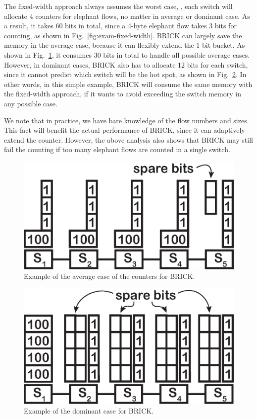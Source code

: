 The fixed-width approach always assumes the worst case, \ie, each switch will allocate 4 counters for elephant flows, no matter in average or dominant case.
As a result, it takes 60 bits in total, since a 4-byte elephant flow takes 3 bits for counting, as shown in Fig.~\ref{fig:exam-fixed-width}.
BRICK can largely save the memory in the average case, because it can flexibly extend the 1-bit bucket.
As shown in Fig.~\ref{fig:exam-brick-avg}, it consumes 30 bits in total to handle all possible average cases.
However, in dominant cases, BRICK also has to allocate 12 bits for each switch, since it cannot predict which switch will be the hot spot, as shown in Fig.~\ref{fig:exam-brick-dmn}.
In other words, in this simple example, BRICK will consume the same memory with the fixed-width approach, if it wants to avoid exceeding the switch memory in any possible case.

We note that in practice, we have bare knowledge of the flow numbers and sizes.
This fact will benefit the actual performance of BRICK, since it can adaptively extend the counter.
However, the above analysis also shows that BRICK may still fail the counting if too many elephant flows are counted in a single switch.

\begin{figure}[t]
    \centering
    \includegraphics[width=0.6\linewidth]{pic/exam-brick-avg}
    \caption{Example of the average case of the counters for BRICK.
     }
    \label{fig:exam-brick-avg}
\end{figure}

\begin{figure}[t]
    \centering
    \includegraphics[width=0.6\linewidth]{pic/exam-brick-dmn}
    \caption{Example of the dominant case for BRICK.
     }
    \label{fig:exam-brick-dmn}
\end{figure}

